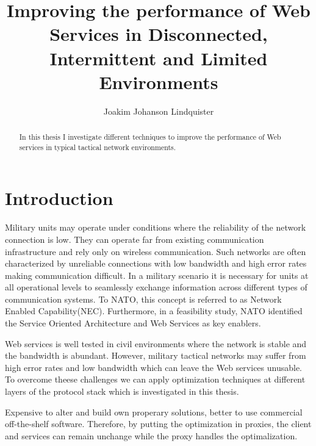 \documentclass[USenglish]{article}
\title{Improving the performance of Web Services in Disconnected, Intermittent and Limited Environments}
\author{Joakim Johanson Lindquister}
\begin{document}
\ififorside{}

\begin{abstract}
In this thesis I investigate different techniques to improve the performance of Web services in typical tactical network environments.
\end{abstract}
\pagebreak

\tableofcontents 
\listoftables
\listoffigures

\pagebreak


\part{Introduction}
Military units may operate under conditions where the reliability of the network connection is low. They can operate far from existing communication infrastructure and rely only on wireless communication. Such networks are often characterized by unreliable connections with low bandwidth and high error rates making communication difficult. In a military scenario it is necessary for units at all operational levels to seamlessly exchange information across different types of communication systems. To NATO, this concept is referred to as Network Enabled Capability(NEC). Furthermore, in a feasibility study, NATO identified the Service Oriented Architecture and Web Services as key enablers\cite{nnec-study}.

Web services is well tested in civil environments where the network is stable and the bandwidth is abundant. However, military tactical networks may suffer from high error rates and low bandwidth which can leave the Web services unusable. To overcome theese challenges we can apply optimization techniques at different layers of the protocol stack which is investigated in this thesis.


Expensive to alter and build own properary solutions, better to use commercial off-the-shelf software. Therefore, by putting the optimization in proxies, the client and services can remain unchange while the proxy handles the optimalization.

\end{document}
